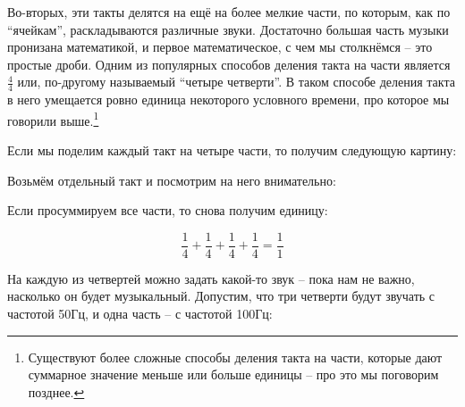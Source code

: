 \documentclass[a4paper,twoside]{book}
\begin{document}
Во-вторых, эти такты делятся на ещё на более мелкие части, по которым, как по
``ячейкам'', раскладываются различные звуки. Достаточно большая часть музыки
пронизана математикой, и первое математическое, с чем мы столкнёмся -- это
простые дроби. Одним из популярных способов деления такта на части является
$\frac{4}{4}$ или, по-другому называемый ``четыре четверти''. В таком способе
деления такта в него умещается ровно единица некоторого условного времени, про
которое мы говорили выше.\footnote{Существуют более сложные способы деления
такта на части, которые дают суммарное значение меньше или больше единицы -- про
это мы поговорим позднее.}

Если мы поделим каждый такт на четыре части, то получим следующую картину:


Возьмём отдельный такт и посмотрим на него внимательно:


Если просуммируем все части, то снова получим единицу:

\begin{equation}
  \frac{1}{4} + \frac{1}{4} + \frac{1}{4} + \frac{1}{4} = \frac{1}{1}
\end{equation}

На каждую из четвертей можно задать какой-то звук -- пока нам не важно, насколько
он будет музыкальный. Допустим, что три четверти будут звучать с частотой 50Гц,
и одна часть -- с частотой 100Гц:

\end{document}
